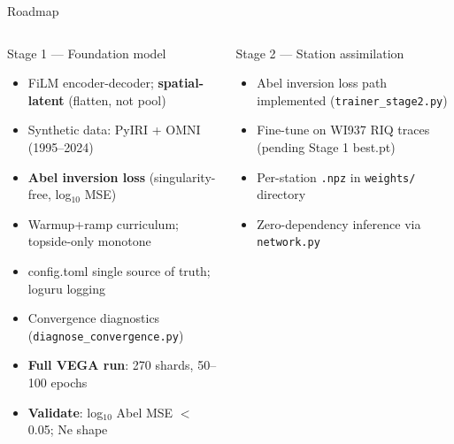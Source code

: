 \documentclass[aspectratio=169,10pt]{beamer}
\begin{document}
\begin{frame}{Roadmap}
\begin{columns}
\begin{block}{Stage 1 — Foundation model}
  \scriptsize
  \begin{itemize}
    \item[$\checkmark$] FiLM encoder-decoder; \textbf{spatial-latent} (flatten, not pool)
    \item[$\checkmark$] Synthetic data: PyIRI + OMNI (1995--2024)
    \item[$\checkmark$] \textbf{Abel inversion loss} (singularity-free, log$_{10}$ MSE)
    \item[$\checkmark$] Warmup+ramp curriculum; topside-only monotone
    \item[$\checkmark$] config.toml single source of truth; loguru logging
    \item[$\checkmark$] Convergence diagnostics (\texttt{diagnose\_convergence.py})
    \item[$\square$] \textbf{Full VEGA run}: 270 shards, 50--100 epochs
    \item[$\square$] \textbf{Validate}: log$_{10}$ Abel MSE $<$ 0.05; Ne shape
  \end{itemize}
\end{block}
\vspace{3pt}
\begin{block}{Stage 2 — Station assimilation}
  \scriptsize
  \begin{itemize}
    \item[$\checkmark$] Abel inversion loss path implemented (\texttt{trainer\_stage2.py})
    \item[$\square$] Fine-tune on WI937 RIQ traces (pending Stage 1 best.pt)
    \item[$\square$] Per-station \texttt{.npz} in \texttt{weights/} directory
    \item[$\square$] Zero-dependency inference via \texttt{network.py}
  \end{itemize}
\end{block}


\end{columns}
\end{frame}
\end{document}
